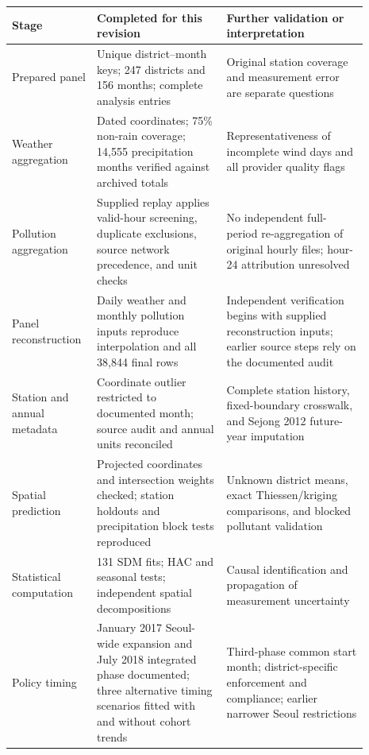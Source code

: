\begin{tabular}{p{0.18\linewidth}p{0.34\linewidth}p{0.37\linewidth}}
\toprule
Stage & Completed for this revision & Further validation or interpretation \\
\midrule
Prepared panel & Unique district--month keys; 247 districts and 156 months; complete analysis entries & Original station coverage and measurement error are separate questions \\
Weather aggregation & Dated coordinates; 75\% non-rain coverage; 14,555 precipitation months verified against archived totals & Representativeness of incomplete wind days and all provider quality flags \\
Pollution aggregation & Supplied replay applies valid-hour screening, duplicate exclusions, source network precedence, and unit checks & No independent full-period re-aggregation of original hourly files; hour-24 attribution unresolved \\
Panel reconstruction & Daily weather and monthly pollution inputs reproduce interpolation and all 38,844 final rows & Independent verification begins with supplied reconstruction inputs; earlier source steps rely on the documented audit \\
Station and annual metadata & Coordinate outlier restricted to documented month; source audit and annual units reconciled & Complete station history, fixed-boundary crosswalk, and Sejong 2012 future-year imputation \\
Spatial prediction & Projected coordinates and intersection weights checked; station holdouts and precipitation block tests reproduced & Unknown district means, exact Thiessen/kriging comparisons, and blocked pollutant validation \\
Statistical computation & 131 SDM fits; HAC and seasonal tests; independent spatial decompositions & Causal identification and propagation of measurement uncertainty \\
Policy timing & January 2017 Seoul-wide expansion and July 2018 integrated phase documented; three alternative timing scenarios fitted with and without cohort trends & Third-phase common start month; district-specific enforcement and compliance; earlier narrower Seoul restrictions \\
\bottomrule
\end{tabular}
